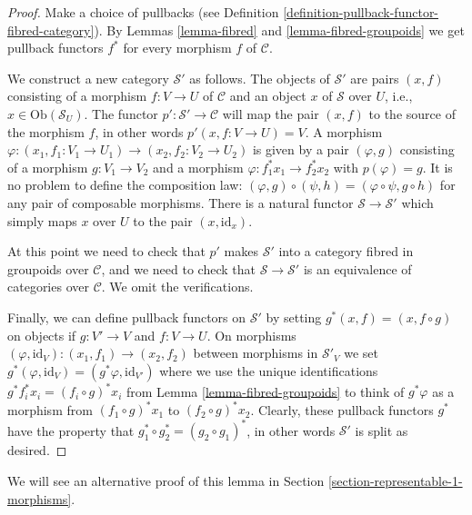 \begin{proof}
Make a choice of pullbacks (see
Definition \ref{definition-pullback-functor-fibred-category}).
By Lemmas \ref{lemma-fibred} and \ref{lemma-fibred-groupoids}
we get pullback functors $f^*$ for
every morphism $f$ of $\mathcal{C}$.

\medskip\noindent
We construct a new category $\mathcal{S}'$ as follows.
The objects of $\mathcal{S}'$ are pairs $(x, f)$
consisting of a morphism $f : V \to U$ of $\mathcal{C}$
and an object $x$ of $\mathcal{S}$ over $U$, i.e.,
$x\in \text{Ob}(\mathcal{S}_U)$. The functor
$p' : \mathcal{S}' \to \mathcal{C}$ will map the pair $(x, f)$ to the source
of the morphism $f$, in other words $p'(x, f : V\to U) = V$. A morphism
$\varphi : (x_1, f_1: V_1 \to U_1) \to (x_2, f_2 : V_2 \to U_2)$ is given by a
pair $(\varphi, g)$ consisting of a morphism $g : V_1 \to V_2$ and a morphism
$\varphi : f_1^\ast x_1 \to f_2^\ast x_2$ with $p(\varphi) = g$. It is no
problem to define the composition law: $(\varphi, g) \circ (\psi, h) =
(\varphi \circ \psi, g\circ h)$ for any pair of composable morphisms.
There is a natural functor $\mathcal{S} \to \mathcal{S}'$ which simply maps
$x$ over $U$ to the pair $(x, \text{id}_x)$.

\medskip\noindent
At this point we need to check that $p'$ makes $\mathcal{S}'$ into a category
fibred in groupoids over $\mathcal{C}$, and we need to check that
$\mathcal{S} \to \mathcal{S}'$ is an equivalence of categories over
$\mathcal{C}$. We omit the verifications.

\medskip\noindent
Finally, we can define pullback functors on $\mathcal{S}'$
by setting $g^\ast(x, f) = (x, f \circ g)$ on objects if
$g : V' \to V$ and $f : V \to U$. On morphisms
$(\varphi, \text{id}_V) : (x_1, f_1) \to (x_2, f_2)$
between morphisms in $\mathcal{S}'_V$ we set $g^\ast(\varphi, \text{id}_V) =
(g^\ast\varphi, \text{id}_{V'})$ where we use the unique identifications
$g^\ast f_i^\ast x_i = (f_i \circ g)^\ast x_i$ from Lemma
\ref{lemma-fibred-groupoids} to think of $g^\ast\varphi$ as a morphism from
$(f_1 \circ g)^\ast x_1$ to $(f_2 \circ g)^\ast x_2$. Clearly, these pullback
functors $g^\ast$ have the property that
$g_1^\ast \circ g_2^\ast = (g_2\circ g_1)^\ast$, in other words $\mathcal{S}'$
is split as desired.
\end{proof}

\noindent
We will see an alternative proof of this lemma in
Section \ref{section-representable-1-morphisms}.








